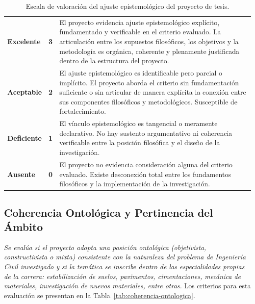 \begin{table}[htbp]
\centering
\scriptsize
\caption{Escala de valoración del ajuste epistemológico del proyecto de tesis.}
\label{tab:escala-epistemologica}
\begin{tabularx}{\textwidth}{|C{2.8cm}|C{1cm}|X|}
\hline
{}
 &  &  \\ \hline
\textcolor{epgreen}{\textbf{Excelente}} & \textbf{3} & El proyecto evidencia ajuste epistemológico explícito, fundamentado y verificable en el criterio evaluado. La articulación entre los supuestos filosóficos, los objetivos y la metodología es orgánica, coherente y plenamente justificada dentro de la estructura del proyecto. \\ \hline
{}
\textcolor{epblue}{\textbf{Aceptable}} & \textbf{2} & El ajuste epistemológico es identificable pero parcial o implícito. El proyecto aborda el criterio sin fundamentación suficiente o sin articular de manera explícita la conexión entre sus componentes filosóficos y metodológicos. Susceptible de fortalecimiento. \\ \hline
\textcolor{eporange}{\textbf{Deficiente}} & \textbf{1} & El vínculo epistemológico es tangencial o meramente declarativo. No hay sustento argumentativo ni coherencia verificable entre la posición filosófica y el diseño de la investigación. \\ \hline
{}
\textcolor{epred}{\textbf{Ausente}} & \textbf{0} & El proyecto no evidencia consideración alguna del criterio evaluado. Existe desconexión total entre los fundamentos filosóficos y la implementación de la investigación. \\ \hline
\end{tabularx}
\end{table}

\clearpage
\subsection{Coherencia Ontológica y Pertinencia del Ámbito}

\textit{Se evalúa si el proyecto adopta una posición ontológica (objetivista, constructivista o mixta) consistente con la naturaleza del problema de Ingeniería Civil investigado y si la temática se inscribe dentro de las especialidades propias de la carrera: estabilización de suelos, pavimentos, cimentaciones, mecánica de materiales, investigación de nuevos materiales, entre otras.} Los criterios para esta evaluación se presentan en la Tabla~\ref{tab:coherencia-ontologica}.

